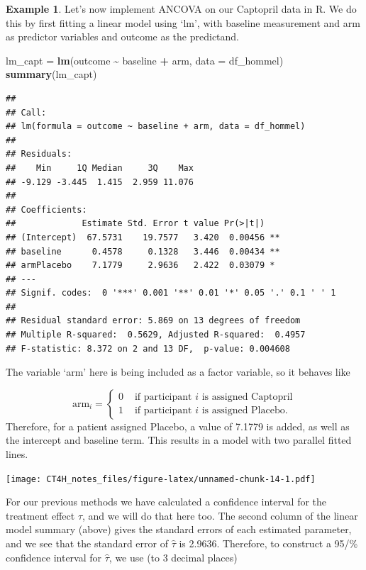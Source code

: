 \documentclass[
  openany]{book}
\newenvironment{Shaded}{\begin{snugshade}}{\end{snugshade}}
\newcommand{\AttributeTok}[1]{\textcolor[rgb]{0.13,0.29,0.53}{#1}}
\newcommand{\FunctionTok}[1]{\textcolor[rgb]{0.13,0.29,0.53}{\textbf{#1}}}
\newcommand{\NormalTok}[1]{#1}
\newcommand{\OtherTok}[1]{\textcolor[rgb]{0.56,0.35,0.01}{#1}}
\newcommand{\SpecialCharTok}[1]{\textcolor[rgb]{0.81,0.36,0.00}{\textbf{#1}}}
\theoremstyle{definition}
\theoremstyle{definition}
\newtheorem{example}{Example}[chapter]
\theoremstyle{definition}
\theoremstyle{definition}
\theoremstyle{remark}
\begin{document}
\begin{example}
Let's now implement ANCOVA on our Captopril data in R.
We do this by first fitting a linear model using `lm', with baseline measurement and arm as predictor variables and outcome as the predictand.

\begin{Shaded}
\begin{Highlighting}[]
\NormalTok{lm\_capt }\OtherTok{=} \FunctionTok{lm}\NormalTok{(outcome }\SpecialCharTok{\textasciitilde{}}\NormalTok{ baseline }\SpecialCharTok{+}\NormalTok{ arm, }\AttributeTok{data =}\NormalTok{ df\_hommel)}
\FunctionTok{summary}\NormalTok{(lm\_capt)}
\end{Highlighting}
\end{Shaded}

\begin{verbatim}
## 
## Call:
## lm(formula = outcome ~ baseline + arm, data = df_hommel)
## 
## Residuals:
##    Min     1Q Median     3Q    Max 
## -9.129 -3.445  1.415  2.959 11.076 
## 
## Coefficients:
##             Estimate Std. Error t value Pr(>|t|)   
## (Intercept)  67.5731    19.7577   3.420  0.00456 **
## baseline      0.4578     0.1328   3.446  0.00434 **
## armPlacebo    7.1779     2.9636   2.422  0.03079 * 
## ---
## Signif. codes:  0 '***' 0.001 '**' 0.01 '*' 0.05 '.' 0.1 ' ' 1
## 
## Residual standard error: 5.869 on 13 degrees of freedom
## Multiple R-squared:  0.5629, Adjusted R-squared:  0.4957 
## F-statistic: 8.372 on 2 and 13 DF,  p-value: 0.004608
\end{verbatim}

The variable `arm' here is being included as a factor variable, so it behaves like

\[
\text{arm}_i =
\begin{cases}
0 & \text{ if participant }i\text{ is assigned Captopril}\\
1 & \text{ if participant }i\text{ is assigned Placebo}.
\end{cases}
\]
Therefore, for a patient assigned Placebo, a value of 7.1779 is added, as well as the intercept and baseline term. This results in a model with two parallel fitted lines.

\texttt{[image: CT4H\_notes\_files/figure-latex/unnamed-chunk-14-1.pdf]}

For our previous methods we have calculated a confidence interval for the treatment effect \(\tau\), and we will do that here too. The second column of the linear model summary (above) gives the standard errors of each estimated parameter, and we see that the standard error of \(\hat{\tau}\) is 2.9636. Therefore, to construct a 95/\% confidence interval for \(\hat{\tau}\), we use (to 3 decimal places)


\end{example}
\end{document}
